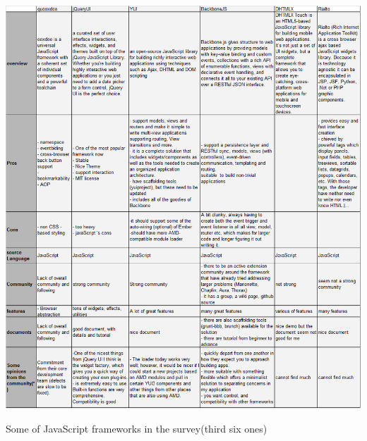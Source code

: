 \documentclass[14pt,a4paper]{extreport}
\begin{document}
			\begin{table}[ht]
				\begin{center}
					\includegraphics[scale=0.4]{JavaFrameTable3.png}
				\caption{Some of JavaScript frameworks in the survey(third six ones)}
				\end{center}
			
			\end{table}
			
\end{document}
